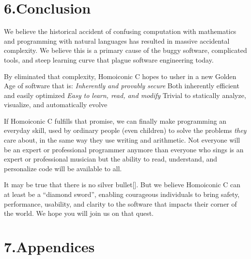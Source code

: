\documentclass[preprint]{{acmart}}
\begin{document}
\section{6.\hspace*{0.5em}Conclusion}\label{sec-conclusion}%

\noindent{}We believe the historical accident of confusing computation with
mathematics and programming with natural languages has resulted in
massive accidental complexity. We believe this is a primary cause of the
buggy software, complicated tools, and steep learning curve that plague software
engineering today.%

By eliminated that complexity, Homoiconic C hopes to usher in a new
Golden Age of software that is:
\emph{ Inherently and provably secure 
} Both inherently efficient and easily optimized
\emph{ Easy to learn, read, and modify
} Trivial to statically analyze, visualize, and automatically evolve%

If Homoiconic C fulfills that promise, we can finally make programming an
everyday skill, used by ordinary people (even children) to solve the
problems \emph{they} care about, in the same way they use writing and
arithmetic. Not everyone will be an expert or professional programmer \textendash{}
anymore than everyone who sings is an expert or professional musician \textendash{}
but the ability to read, understand, and personalize code will be
available to all.%

It may be true that there is no silver bullet[].   But we believe
Homoiconic C can at least be a \textquotedblleft{}diamond sword\textquotedblright{}, enabling courageous individuals
to bring safety, performance, usability, and clarity to the software that
impacts their corner of the world.  We hope you will join us on that quest.%

\section{7.\hspace*{0.5em}Appendices}\label{sec-appendices}%
\end{document}
